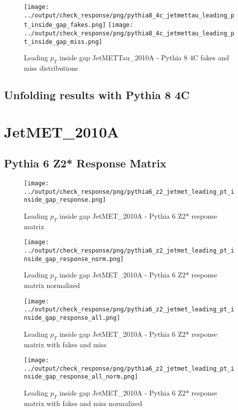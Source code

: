 \documentclass[11pt]{book}
\begin{document}
\begin{figure}[ht]
\centering
\texttt{[image: ../output/check\_response/png/pythia8\_4c\_jetmettau\_leading\_pt\_inside\_gap\_fakes.png]}
\texttt{[image: ../output/check\_response/png/pythia8\_4c\_jetmettau\_leading\_pt\_inside\_gap\_miss.png]}
\caption{Leading $p_{T}$ inside gap JetMETTau\_2010A - Pythia 8 4C fakes and miss distributions}
\label{p8_jetmettau_leading_pt_inside_gap_fakesmiss}
\end{figure}


\clearpage
\subsection{Unfolding results with Pythia 8 4C}


\section{JetMET\_2010A}
\subsection{Pythia 6 Z2* Response Matrix}

\begin{figure}[ht]
\centering
\texttt{[image: ../output/check\_response/png/pythia6\_z2\_jetmet\_leading\_pt\_inside\_gap\_response.png]}
\caption{Leading $p_{T}$ inside gap JetMET\_2010A - Pythia 6 Z2* response matrix}
\label{p6_jetmet_leading_pt_inside_gap_response}
\end{figure}

\begin{figure}[ht]
\centering
\texttt{[image: ../output/check\_response/png/pythia6\_z2\_jetmet\_leading\_pt\_inside\_gap\_response\_norm.png]}
\caption{Leading $p_{T}$ inside gap JetMET\_2010A - Pythia 6 Z2* response matrix normalized}
\label{p6_jetmet_leading_pt_inside_gap_response_norm}
\end{figure}

\begin{figure}[ht]
\centering
\texttt{[image: ../output/check\_response/png/pythia6\_z2\_jetmet\_leading\_pt\_inside\_gap\_response\_all.png]}
\caption{Leading $p_{T}$ inside gap JetMET\_2010A - Pythia 6 Z2* response matrix with fakes and miss}
\label{p6_jetmet_leading_pt_inside_gap_response_all}
\end{figure}

\begin{figure}[ht]
\centering
\texttt{[image: ../output/check\_response/png/pythia6\_z2\_jetmet\_leading\_pt\_inside\_gap\_response\_all\_norm.png]}
\caption{Leading $p_{T}$ inside gap JetMET\_2010A - Pythia 6 Z2* response matrix with fakes and miss normalized}
\label{p6_jetmet_leading_pt_inside_gap_response_all_norm}
\end{figure}
\end{document}
